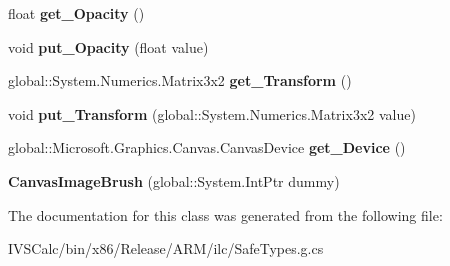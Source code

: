 \begin{DoxyCompactItemize}
\mbox{\label{class_microsoft_1_1_graphics_1_1_canvas_1_1_brushes_1_1_canvas_image_brush_afaed5d2ea1294c742aa83915f761c1de}} 
float {\bfseries get\+\_\+\+Opacity} ()
\item 
\mbox{\label{class_microsoft_1_1_graphics_1_1_canvas_1_1_brushes_1_1_canvas_image_brush_a027949e4f2b38847ed4732614740696b}} 
void {\bfseries put\+\_\+\+Opacity} (float value)
\item 
\mbox{\label{class_microsoft_1_1_graphics_1_1_canvas_1_1_brushes_1_1_canvas_image_brush_aecf3140564df93caed075a2657fac1ee}} 
global\+::\+System.\+Numerics.\+Matrix3x2 {\bfseries get\+\_\+\+Transform} ()
\item 
\mbox{\label{class_microsoft_1_1_graphics_1_1_canvas_1_1_brushes_1_1_canvas_image_brush_aacd3a10615ba452348d129139e6f0c68}} 
void {\bfseries put\+\_\+\+Transform} (global\+::\+System.\+Numerics.\+Matrix3x2 value)
\item 
\mbox{\label{class_microsoft_1_1_graphics_1_1_canvas_1_1_brushes_1_1_canvas_image_brush_abbc8ded9bdef5ad7ab6029fa7bc1eef6}} 
global\+::\+Microsoft.\+Graphics.\+Canvas.\+Canvas\+Device {\bfseries get\+\_\+\+Device} ()
\item 
\mbox{\label{class_microsoft_1_1_graphics_1_1_canvas_1_1_brushes_1_1_canvas_image_brush_acbfe907c1015a95d93b5213836119f03}} 
{\bfseries Canvas\+Image\+Brush} (global\+::\+System.\+Int\+Ptr dummy)
\end{DoxyCompactItemize}


The documentation for this class was generated from the following file\+:\begin{DoxyCompactItemize}
\item 
I\+V\+S\+Calc/bin/x86/\+Release/\+A\+R\+M/ilc/Safe\+Types.\+g.\+cs\end{DoxyCompactItemize}
